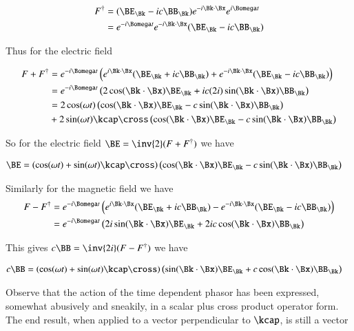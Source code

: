 \begin{align*}
F^\dagger
&= (\BE_\Bk - i c \BB_\Bk) e^{-i \Bk \cdot \Bx} e^{i\Bomega t} \\
&=
e^{-i\Bomega t}
e^{-i \Bk \cdot \Bx}
(\BE_\Bk - i c \BB_\Bk)
\end{align*}

Thus for the electric field

\begin{align*}
F + F^\dagger
&=
e^{-i\Bomega t} \left(
 e^{i \Bk \cdot \Bx} (\BE_\Bk + i c \BB_\Bk)
+e^{-i \Bk \cdot \Bx} (\BE_\Bk - i c \BB_\Bk)
\right) \\
&=
e^{-i\Bomega t} \left(
 2 \cos(\Bk \cdot \Bx) \BE_\Bk
+ i c (2 i) \sin(\Bk \cdot \Bx) \BB_\Bk
\right) \\
&=
2 \cos(\omega t) \left(
 \cos(\Bk \cdot \Bx) \BE_\Bk
- c \sin(\Bk \cdot \Bx) \BB_\Bk
\right) \\
&+ 2
\sin(\omega t)
\kcap \cross
\left(
 \cos(\Bk \cdot \Bx) \BE_\Bk
- c \sin(\Bk \cdot \Bx) \BB_\Bk
\right) \\
\end{align*}

So for the electric field $\BE = \inv{2}(F + F^\dagger)$ we have

\begin{align}\label{eqn:electricSplit}
\BE &=
\left( \cos(\omega t) + \sin(\omega t) \kcap \cross \right)
\left(
 \cos(\Bk \cdot \Bx) \BE_\Bk
- c \sin(\Bk \cdot \Bx) \BB_\Bk
\right)
\end{align}

Similarly for the magnetic field we have
\begin{align*}
F - F^\dagger
&=
e^{-i\Bomega t} \left(
 e^{i \Bk \cdot \Bx} (\BE_\Bk + i c \BB_\Bk)
-e^{-i \Bk \cdot \Bx} (\BE_\Bk - i c \BB_\Bk)
\right) \\
&=
e^{-i\Bomega t} \left(
 2 i \sin(\Bk \cdot \Bx) \BE_\Bk
+ 2 i c \cos(\Bk \cdot \Bx) \BB_\Bk
\right) \\
\end{align*}

This gives $c \BB = \inv{2i}(F - F^\dagger)$ we have

\begin{align}\label{eqn:magneticSplit}
c \BB &=
\left( \cos(\omega t) + \sin(\omega t) \kcap \cross \right)
\left(
 \sin(\Bk \cdot \Bx) \BE_\Bk
+ c \cos(\Bk \cdot \Bx) \BB_\Bk
\right)
\end{align}

Observe that the action of the time dependent phasor has been expressed, somewhat abusively and sneakily, in a scalar plus cross product operator form.  The end result, when applied to a vector perpendicular to $\kcap$, is still a vector

